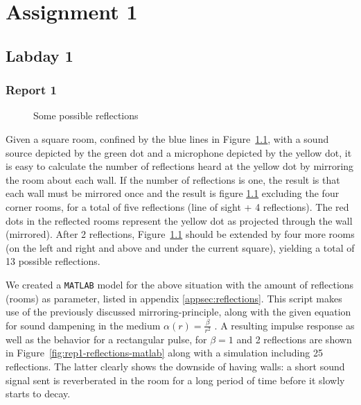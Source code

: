 \documentclass[11pt,titlepage]{report}
\begin{document}
\chapter{Assignment 1}
\section{Labday 1}
\subsection{Report 1}

\begin{figure}[H]
	\centering
	
	\caption{Some possible reflections}
	\label{fig:rep1-reflections-ill}
\end{figure}

Given a square room, confined by the blue lines in Figure~\ref{fig:rep1-reflections-ill}, with a sound source depicted by the green dot and a microphone depicted by the yellow dot, it is easy to calculate the number of reflections heard at the yellow dot by mirroring the room about each wall. If the number of reflections is one, the result is that each wall must be mirrored once and the result is figure \ref{fig:rep1-reflections-ill} excluding the four corner rooms, for a total of five reflections (line of sight + 4 reflections). The red dots in the reflected rooms represent the yellow dot as projected through the wall (mirrored). After 2 reflections, Figure~\ref{fig:rep1-reflections-ill} should be extended by four more rooms (on the left and right and above and under the current square), yielding a total of 13 possible reflections.

We created a \texttt{MATLAB} model for the above situation with the amount of reflections (rooms) as parameter, listed in appendix \ref{appsec:reflections}. This script makes use of the previously discussed mirroring-principle, along with the given equation for sound dampening in the medium $\alpha(r) = \frac{\beta}{r^2}$ \cite[91]{epo4-manual}. A resulting impulse response as well as the behavior for a rectangular pulse, for $\beta = 1$ and 2 reflections are shown in Figure~\ref{fig:rep1-reflections-matlab} along with a simulation including 25 reflections. The latter clearly shows the downside of having walls: a short sound signal sent is reverberated in the room for a long period of time before it slowly starts to decay.
\end{document}
